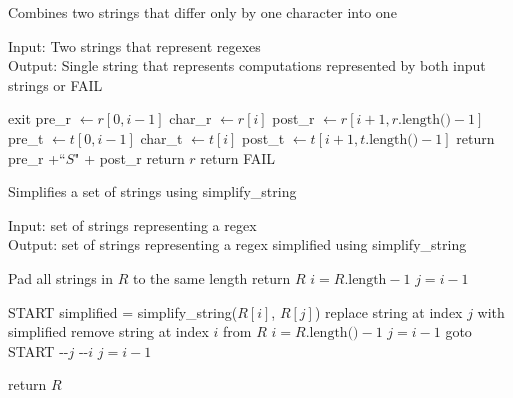 \documentclass[runningheads]{llncs}
\begin{document}
\begin{algorithm}[H]
\caption{Combines two strings that differ only by one character into one}
Input: Two strings that represent regexes\\
Output: Single string that represents computations represented by both input strings or FAIL
\begin{algorithmic}
     exit
        \EndIf
        \State pre\_r $\leftarrow r[0, i-1]$ 
        \State char\_r $\leftarrow r[i]$ 
        \State post\_r $\leftarrow r[i+1, r\text{.length()}-1]$ 
        \State pre\_t $\leftarrow t[0, i-1]$ 
        \State char\_t $\leftarrow t[i]$ 
        \State post\_t $\leftarrow t[i+1, t\text{.length()}-1]$
                \State return pre\_r +``$S$" + post\_r 
            \Else
                \State return $r$
            \EndIf
        \EndIf
    \EndFor
    \State return FAIL 
\EndProcedure
\end{algorithmic}
\end{algorithm}
 
\begin{algorithm}[H]
\caption{Simplifies a set of strings using simplify\_string}
Input: set of strings representing a regex\\
Output: set of strings representing a regex simplified using simplify\_string
\begin{algorithmic}
    \State Pad all strings in $R$ to the same length
     return $R$
        \EndIf
    \State $i = R\text{.length} - 1$
    \State $j = i - 1$
    
    \State START
            \State simplified = simplify\_string($R[i]$, $R[j]$) 
                \State replace string at index $j$ with simplified
                \State remove string at index $i$ from $R$
                \State $i = R\text{.length()} - 1$
                \State $j = i - 1$
                \State goto START
                \EndIf
            \State -{}-$j$
            \EndWhile
        \State -{}-$i$
        \State $j = i - 1$
        \EndWhile
        
    \State return $R$
\EndProcedure
\end{algorithmic}
\end{algorithm}
\end{document}
